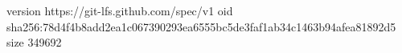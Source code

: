 version https://git-lfs.github.com/spec/v1
oid sha256:78d4f4b8add2ea1c067390293ea6555bc5de3faf1ab34c1463b94afea81892d5
size 349692

